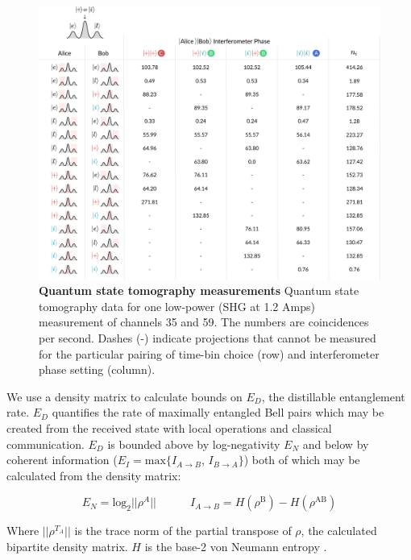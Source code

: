 \documentclass[11pt]{caltech_thesis} %
\begin{document}
\hypertarget{fig:counts_chart}{%
\begin{figure}
\centering
\includegraphics[width=1\textwidth,height=\textheight]{./chapter_05/figs/chart_1_light.pdf}
\caption[{Quantum state tomography measurements}]{\textbf{Quantum state tomography measurements} Quantum state tomography data for one low-power (SHG at 1.2 Amps) measurement of channels 35 and 59. The numbers are coincidences per second. Dashes (-) indicate projections that cannot be measured for the particular pairing of time-bin choice (row) and interferometer phase setting (column).}
\label{fig:counts_chart}
\end{figure}
}

We use a density matrix to calculate bounds on $E_D$, the distillable entanglement rate. $E_D$ quantifies the rate of maximally entangled Bell pairs which may be created from the received state with local operations and classical communication. $E_D$ is bounded above by log-negativity $E_N$ and below by coherent information ($E_I = \mathrm{max}\{I_{A\rightarrow B}$, $I_{B\rightarrow A}\}$) \autocite{Alshowkan2022,Eisert2000} both of which may be calculated from the density matrix:

$$E_N = \mathrm{log_2}||\rho^{A}|| \quad\quad\quad I_{A\rightarrow B} = H\left(\rho^\mathrm{B}\right)-H\left(\rho^{\mathrm{AB}}\right)$$

Where $||\rho^{T_A}||$ is the trace norm of the partial transpose of $\rho$, the calculated bipartite density matrix. $H$ is the base-2 von Neumann entropy \autocite{Vidal2002negativity,Devetak2004coherent}.
\end{document}
